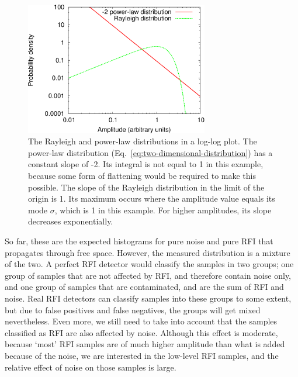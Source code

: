 \documentclass[useAMS,usenatbib]{mn2e}
\begin{document}
\begin{figure}
\begin{center}\hspace{-5mm}\includegraphics[width=8cm]{img/plot-rayleigh-and-rfi-trimmed}
\caption{The Rayleigh and power-law distributions in a log-log plot. The power-law distribution (Eq.~\eqref{eq:two-dimensional-distribution}) has a constant slope of -2. Its integral is not equal to 1 in this example, because some form of flattening would be required to make this possible. The slope of the Rayleigh distribution in the limit of the origin is 1. Its maximum occurs where the amplitude value equals its mode $\sigma$, which is 1 in this example. For higher amplitudes, its slope decreases exponentially.}
\label{fig:rayleigh-and-rfi-distributions}
\end{center}
\end{figure}

So far, these are the expected histograms for pure noise and pure RFI that propagates through free space. However, the measured distribution is a mixture of the two. A perfect RFI detector would classify the samples in two groups; one group of samples that are not affected by RFI, and therefore contain noise only, and one group of samples that are contaminated, and are the sum of RFI and noise. Real RFI detectors can classify samples into these groups to some extent, but due to false positives and false negatives, the groups will get mixed nevertheless. Even more, we still need to take into account that the samples classified as RFI are also affected by noise. Although this effect is moderate, because `most' RFI samples are of much higher amplitude than what is added because of the noise, we are interested in the low-level RFI samples, and the relative effect of noise on those samples is large.
\end{document}
